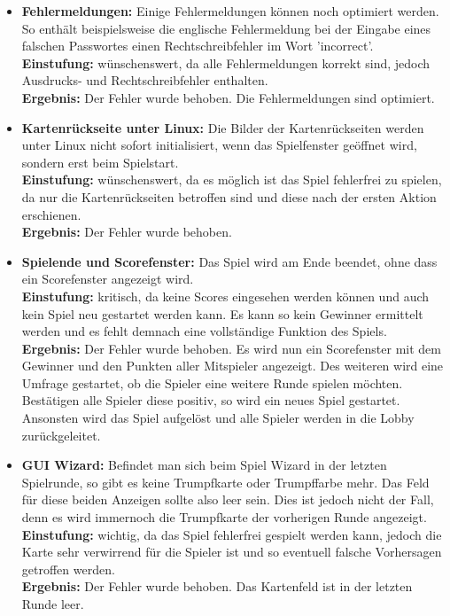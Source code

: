 \documentclass[a4paper]{article}
\begin{document}
\begin{itemize}
	\item \textbf{Fehlermeldungen:} Einige Fehlermeldungen können noch optimiert werden. So enthält beispielsweise die englische Fehlermeldung bei der Eingabe eines falschen Passwortes einen Rechtschreibfehler im Wort 'incorrect'. \\
	\textbf{Einstufung:} wünschenswert, da alle Fehlermeldungen korrekt sind, jedoch Ausdrucks- und Rechtschreibfehler enthalten.\\
	\textbf{Ergebnis:} Der Fehler wurde behoben. Die Fehlermeldungen sind optimiert.\\
	
	\item \textbf{Kartenrückseite unter Linux:} Die Bilder der Kartenrückseiten werden unter Linux nicht sofort initialisiert, wenn das Spielfenster geöffnet wird, sondern erst beim Spielstart. \\
	\textbf{Einstufung:} wünschenswert, da es möglich ist das Spiel fehlerfrei zu spielen, da nur die Kartenrückseiten betroffen sind und diese nach der ersten Aktion erschienen.\\
	\textbf{Ergebnis:} Der Fehler wurde behoben.\\
	
	\item \textbf{Spielende und Scorefenster:}  Das Spiel wird am Ende beendet, ohne dass ein Scorefenster angezeigt wird.\\
	\textbf{Einstufung:} kritisch, da keine Scores eingesehen werden können und auch kein Spiel neu gestartet werden kann. Es kann so kein Gewinner ermittelt werden und es fehlt demnach eine vollständige Funktion des Spiels.\\
	\textbf{Ergebnis:} Der Fehler wurde behoben. Es wird nun ein Scorefenster mit dem Gewinner und den Punkten aller Mitspieler angezeigt. Des weiteren wird eine Umfrage gestartet, ob die Spieler eine weitere Runde spielen möchten. Bestätigen alle Spieler diese positiv, so wird ein neues Spiel gestartet. Ansonsten wird das Spiel aufgelöst und alle Spieler werden in die 		Lobby zurückgeleitet.\\
	
	\item \textbf{GUI Wizard:} Befindet man sich beim Spiel Wizard in der letzten Spielrunde, so gibt es keine Trumpfkarte oder 	Trumpffarbe mehr. Das Feld für diese beiden Anzeigen sollte also leer sein. Dies ist jedoch nicht der Fall, denn es wird 			immernoch die Trumpfkarte der vorherigen Runde angezeigt.\\
	\textbf{Einstufung:} wichtig, da das Spiel fehlerfrei gespielt werden kann, jedoch die Karte sehr verwirrend für die Spieler ist und so eventuell falsche Vorhersagen getroffen werden.\\
	\textbf{Ergebnis:} Der Fehler wurde behoben. Das Kartenfeld ist in der letzten Runde leer.\\
	\end{itemize}
	
\end{document}
